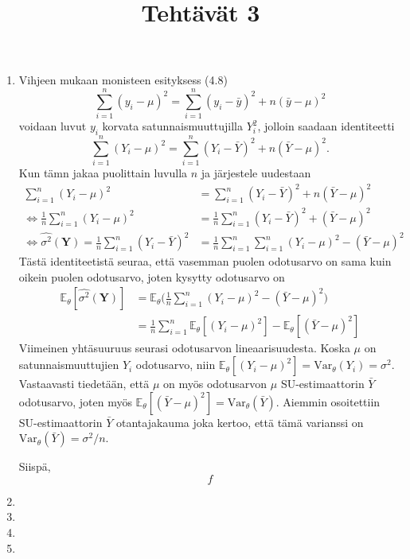 \documentclass[12pt]{article}
\title{Tehtävät 3}
\newcommand{\E}{\mathbb{E}}
\begin{document}
\maketitle
\begin{enumerate}
\item[1.] Vihjeen mukaan monisteen esityksess (4.8) 
$$
\sum_{i=1}^n (y_i - \mu)^2 = \sum_{i=1}^n (y_i - \bar{y})^2 + n(\bar{y} - \mu)^2
$$
voidaan luvut $y_i$ korvata satunnaismuuttujilla $Y_i^2$, jolloin saadaan identiteetti
$$
\sum_{i=1}^n (Y_i - \mu)^2 = \sum_{i=1}^n (Y_i - \bar{Y})^2 + n(\bar{Y} - \mu)^2.
$$
Kun tämn jakaa puolittain luvulla $n$ ja järjestele uudestaan
$$
\begin{aligned}
\sum_{i=1}^n (Y_i - \mu)^2 &= \sum_{i=1}^n (Y_i - \bar{Y})^2 + n(\bar{Y} - \mu)^2 \\
\Leftrightarrow \frac{1}{n} \sum_{i=1}^n (Y_i - \mu)^2 &= \frac{1}{n} \sum_{i=1}^n (Y_i - \bar{Y})^2 + (\bar{Y} - \mu)^2 \\
\Leftrightarrow \hat{\sigma^2}(\textbf{Y}) = \frac{1}{n}\sum_{i=1}^n (Y_i - \bar{Y})^2 &= \frac{1}{n} \sum_{i=1}^n \sum_{i=1}^n(Y_i - \mu)^2 - (\bar{Y} - \mu)^2
\end{aligned}
$$
Tästä identiteetistä seuraa, että vasemman puolen odotusarvo on sama kuin oikein puolen odotusarvo, joten kysytty odotusarvo on 
$$
\begin{aligned}
\E_\theta[\hat{\sigma^2}(\textbf{Y})] &= \E_\theta\Bigg( \frac{1}{n}\sum_{i=1}^n(Y_i - \mu)^2 - (\bar{Y} - \mu)^2 \Bigg) \\
    &= \frac{1}{n}\sum_{i=1}^n\E_\theta[(Y_i - \mu)^2] - \E_\theta[(\bar{Y} - \mu)^2]
\end{aligned}
$$
Viimeinen yhtäsuuruus seurasi odotusarvon lineaarisuudesta. Koska $\mu$ on satunnaismuuttujien $Y_i$ odotusarvo, niin $\E_\theta[(Y_i - \mu)^2] = \text{Var}_\theta(Y_i) = \sigma^2$. Vastaavasti tiedetään, että $\mu$ on myös odotusarvon $\mu$ SU-estimaattorin $\bar{Y}$ odotusarvo, joten myös $\E_\theta[(\bar{Y} - \mu)^2] = \text{Var}_\theta(\bar{Y})$. Aiemmin osoitettiin SU-estimaattorin $\bar{Y}$ otantajakauma joka kertoo, että tämä varianssi on $\text{Var}_\theta(\bar{Y}) = \sigma^2 / n.$

Siispä,
$$
f
$$
\item[2.]
\item[3.]
\item[4.]
\item[5.]
\end{enumerate}
\end{document}
